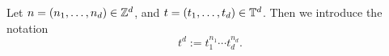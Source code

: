 \begin{definition}
    Let $n = (n_1,\ldots,n_d) \in \mathbb{Z}^d$, and $t = (t_1,\ldots,t_d) \in \mathbb{T}^d$.
    Then we introduce the notation
    \begin{equation}
        t^d := t_1^{n_1}\cdots t_d^{n_d}.
    \end{equation}    
\end{definition}

%    
    

